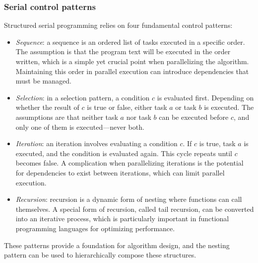 \subsubsection{Serial control patterns}
Structured serial programming relies on four fundamental control patterns:
\begin{itemize}
    \item \textit{Sequence}: a sequence is an ordered list of tasks executed in a specific order. 
        The assumption is that the program text will be executed in the order written, which is a simple yet crucial point when parallelizing the algorithm. 
        Maintaining this order in parallel execution can introduce dependencies that must be managed.
    \item \textit{Selection}: in a selection pattern, a condition $c$ is evaluated first. 
        Depending on whether the result of $c$ is true or false, either task $a$ or task $b$ is executed. 
        The assumptions are that neither task $a$ nor task $b$ can be executed before $c$, and only one of them is executed—never both.
    \item \textit{Iteration}: an iteration involves evaluating a condition $c$. 
        If $c$ is true, task $a$ is executed, and the condition is evaluated again. 
        This cycle repeats until $c$ becomes false. 
        A complication when parallelizing iterations is the potential for dependencies to exist between iterations, which can limit parallel execution.
    \item \textit{Recursion}: recursion is a dynamic form of nesting where functions can call themselves. 
        A special form of recursion, called tail recursion, can be converted into an iterative process, which is particularly important in functional programming languages for optimizing performance.
\end{itemize}
These patterns provide a foundation for algorithm design, and the nesting pattern can be used to hierarchically compose these structures.


